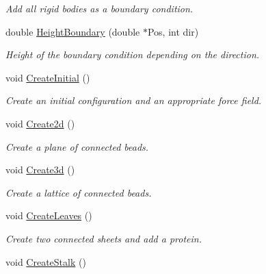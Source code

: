 \begin{DoxyCompactItemize}
\begin{DoxyCompactList}\small\item\em \-Add all rigid bodies as a boundary condition. \end{DoxyCompactList}\item 
double \hyperlink{classForces_a68881ea0f9f8038dc0e6a714df062896}{\-Height\-Boundary} (double $\ast$\-Pos, int dir)
\begin{DoxyCompactList}\small\item\em \-Height of the boundary condition depending on the direction. \end{DoxyCompactList}\item 
\hypertarget{classForces_ab18de8ad228c4133d61e09f94ef4b33f}{void \hyperlink{classForces_ab18de8ad228c4133d61e09f94ef4b33f}{\-Create\-Initial} ()}\label{classForces_ab18de8ad228c4133d61e09f94ef4b33f}

\begin{DoxyCompactList}\small\item\em \-Create an initial configuration and an appropriate force field. \end{DoxyCompactList}\item 
\hypertarget{classForces_a9e66d18b6b637a388161c4310deb71e9}{void \hyperlink{classForces_a9e66d18b6b637a388161c4310deb71e9}{\-Create2d} ()}\label{classForces_a9e66d18b6b637a388161c4310deb71e9}

\begin{DoxyCompactList}\small\item\em \-Create a plane of connected beads. \end{DoxyCompactList}\item 
\hypertarget{classForces_a71fdb49e2a01e439097a4cde373b639f}{void \hyperlink{classForces_a71fdb49e2a01e439097a4cde373b639f}{\-Create3d} ()}\label{classForces_a71fdb49e2a01e439097a4cde373b639f}

\begin{DoxyCompactList}\small\item\em \-Create a lattice of connected beads. \end{DoxyCompactList}\item 
\hypertarget{classForces_ada62abd7228e54fbd365aba5aaf4ce8f}{void \hyperlink{classForces_ada62abd7228e54fbd365aba5aaf4ce8f}{\-Create\-Leaves} ()}\label{classForces_ada62abd7228e54fbd365aba5aaf4ce8f}

\begin{DoxyCompactList}\small\item\em \-Create two connected sheets and add a protein. \end{DoxyCompactList}\item 
\hypertarget{classForces_afea6ddedbed181a50906556f6075257f}{void \hyperlink{classForces_afea6ddedbed181a50906556f6075257f}{\-Create\-Stalk} ()}\label{classForces_afea6ddedbed181a50906556f6075257f}


\end{DoxyCompactItemize}
